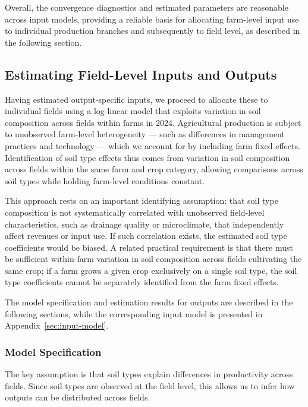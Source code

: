 \documentclass[12pt]{article}
\begin{document}
Overall, the convergence diagnostics and estimated parameters are reasonable across input models, providing a reliable basis for allocating farm-level input use to individual production branches and subsequently to field level, as described in the following section.

\subsection{Estimating Field-Level Inputs and Outputs}
\label{sec:est-fieldlevel-inputs-outputs}
Having estimated output-specific inputs, we proceed to allocate these to individual fields using a log-linear model that exploits variation in soil composition across fields within farms in 2024. 
Agricultural production is subject to unobserved farm-level heterogeneity --- such as differences in management practices and technology --- which we account for by including farm fixed effects. 
Identification of soil type effects thus comes from variation in soil composition across fields within the same farm and crop category, allowing comparisons across soil types while holding farm-level conditions constant.

This approach rests on an important identifying assumption: that soil type composition is not systematically correlated with unobserved field-level characteristics, such as drainage quality or microclimate, that independently affect revenues or input use. 
If such correlation exists, the estimated soil type coefficients would be biased. A related practical requirement is that there must be sufficient within-farm variation in soil composition across fields cultivating the same crop; if a farm grows a given crop exclusively on a single soil type, the soil type coefficients cannot be separately identified from the farm fixed effects.

The model specification and estimation results for outputs are described in the following sections, while the corresponding input model is presented in Appendix~\ref{sec:input-model}.

\subsubsection{Model Specification}
\label{sec:output-model-specification}
The key assumption is that soil types explain differences in productivity across fields.
Since soil types are observed at the field level, this allows us to infer how outputs can be distributed across fields.
\end{document}
